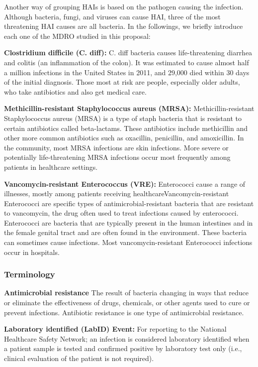 Another way of grouping HAIs is based on the pathogen causing the infection. Although bacteria, fungi, and viruses can cause HAI, three of the most threatening HAI causes are all bacteria. In the followings, we briefly introduce each one of the MDRO studied in this proposal:

{\bf Clostridium difficile (C. diff):} C. diff bacteria causes life-threatening diarrhea and colitis (an inflammation of the colon). It was estimated to cause almost half a million infections in the United States in 2011, and 29,000 died within 30 days of the initial diagnosis. Those most at risk are people, especially older adults, who take antibiotics and also get medical care.

{\bf Methicillin-resistant Staphylococcus aureus (MRSA):}  Methicillin-resistant Staphylococcus aureus (MRSA) is a type of staph bacteria that is resistant to certain antibiotics called beta-lactams. These antibiotics include methicillin and other more common antibiotics such as oxacillin, penicillin, and amoxicillin. In the community, most MRSA infections are skin infections. More severe or potentially life-threatening MRSA infections occur most frequently among patients in healthcare settings.

{\bf Vancomycin-resistant Enterococcus (VRE):} Enterococci cause a range of illnesses, mostly among patients receiving healthcareVancomycin-resistant Enterococci are specific types of antimicrobial-resistant bacteria that are resistant to vancomycin, the drug often used to treat infections caused by enterococci. Enterococci are bacteria that are typically present in the human intestines and in the female genital tract and are often found in the environment. These bacteria can sometimes cause infections. Most vancomycin-resistant Enterococci infections occur in hospitals.

\subsubsection{Terminology}
{\bf Antimicrobial resistance} The result of bacteria changing in ways that reduce or eliminate the effectiveness of drugs, chemicals, or other agents
used to cure or prevent infections. Antibiotic resistance is one type of antimicrobial resistance.

{\bf Laboratory identified (LabID) Event:} For reporting to the National Healthcare Safety Network; an infection is considered laboratory
identified when a patient sample is tested and confirmed positive by laboratory test only (i.e., clinical evaluation of the patient is not required).

